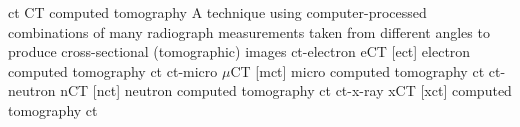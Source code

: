 \newglsXacronym%
{ct}%
{CT}%
{computed tomography}%
{A technique using computer{\--}processed combinations of many radiograph measurements taken from different angles to produce cross{\--}sectional (tomographic) images}%
\newglsXacronym%
{ct-electron}%
{eCT}%
[ect]%
{electron computed tomography}%
{\nopostdesc}%
{ct}%
\newglsXacronym%
{ct-micro}%
{{}$\mu$CT}%
[mct]%
{micro computed tomography}%
{\nopostdesc}%
{ct}%
\newglsXacronym%
{ct-neutron}%
{nCT}%
[nct]%
{neutron computed tomography}%
{\nopostdesc}%
{ct}%
\newglsXacronym%
{ct-x-ray}%
{xCT}%
[xct]%
{{} computed tomography}%
{\nopostdesc}%
{ct}%
